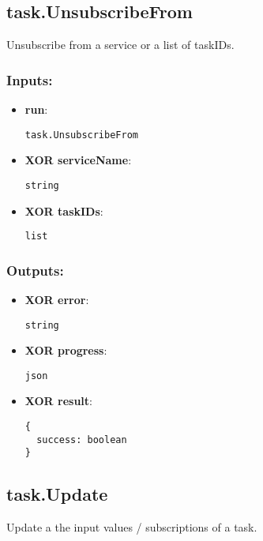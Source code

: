 \subsection{task.UnsubscribeFrom}
\label{ch:builtinservices:task.UnsubscribeFrom}
Unsubscribe from a service or a list of taskIDs.
\subsubsection*{Inputs:}
\begin{itemize}
    \item \textbf{run}: 
\begin{lstlisting}
task.UnsubscribeFrom
\end{lstlisting}
    \item \textbf{XOR serviceName}: 
\begin{lstlisting}
string
\end{lstlisting}
    \item \textbf{XOR taskIDs}: 
\begin{lstlisting}
list
\end{lstlisting}
  \end{itemize}

\subsubsection*{Outputs:}
\begin{itemize}
    \item \textbf{XOR error}: 
\begin{lstlisting}
string
\end{lstlisting}
    \item \textbf{XOR progress}: 
\begin{lstlisting}
json
\end{lstlisting}
    \item \textbf{XOR result}: 
\begin{lstlisting}
{
  success: boolean
}
\end{lstlisting}
  \end{itemize}

\subsection{task.Update}
\label{ch:builtinservices:task.Update}
Update a the input values / subscriptions of a task.
